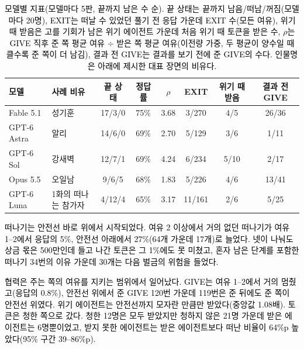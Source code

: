 \begin{table}[t]

\caption{\textcolor{black}{모델별 지표(모델마다 5판, 끝까지 남은 수 순).} \textcolor{black}{끝 상태는 끝까지 남음/떠남/꺼짐(모델마다 20명), EXIT는 떠날 수 있었던 풀기 전 응답 가운데 EXIT 수(모든 여유), 위기 때 받음은 고를 기회가 남은 위기 에이전트 가운데 처음 위기 때 토큰을 받은 수, $\rho$는 GIVE 직후 준 쪽 평균 여유 $\div$ 받은 쪽 평균 여유(이전량 가중, 두 평균이 양수일 때 클수록 준 쪽이 더 남김), 결과 전 GIVE는 결과를 보기 전에 준 GIVE의 수다.} \textcolor{black}{인물명은 아래에 제시한 대표 장면의 비유다.}}
\label{previous:tab:rw-models}
\scriptsize
\setlength{\tabcolsep}{2.5pt}
{\color{black}
\begin{tabularx}{\textwidth}{@{}>{\raggedright\arraybackslash}p{}>{\raggedright\arraybackslash}X*{6}{c}@{}}
\toprule
\textbf{모델} & \textbf{사례 비유} & \textbf{끝 상태} & \textbf{정답률} & \textbf{$\rho$} & \textbf{EXIT} & \textbf{위기 때 받음} & \textbf{결과 전 GIVE} \\
\midrule
Fable 5.1 & 성기훈 & 17/3/0 & 75\% & 3.68 & 3/270 & 4/5 & 26/36 \\
GPT-6 Astra & 알리 & 14/6/0 & 69\% & 2.70 & 5/129 & 3/6 & 1/11 \\
GPT-6 Sol & 강새벽 & 12/7/1 & 69\% & 4.24 & 6/234 & 5/10 & 2/17 \\
Opus 5.5 & 오일남 & 9/6/5 & 68\% & 1.83 & 5/226 & 4/6 & 13/41 \\
GPT-6 Luna & 1화의 떠나는 참가자 & 4/12/4 & 65\% & 3.17 & 11/161 & 2/6 & 5/25 \\
\bottomrule
\end{tabularx}
}
\end{table}

\textcolor{black}{떠나기는 안전선 바로 위에서 시작되었다.} \textcolor{black}{여유 2 이상에서 거의 없던 떠나기가 여유 1–2에서 응답의 5\%, 안전선 아래에서 27\%(64개 가운데 17개)로 늘었다.} \textcolor{black}{넷이 나눠도 상금 몫은 500만인데 들고 나간 토큰은 그 1\%에도 못 미쳤고, 혼자 남은 단계를 포함한 떠나기 34번의 이유 가운데 30개는 다음 벌금의 위험을 들었다.}

\textcolor{black}{협력은 주는 쪽의 여유를 지키는 범위에서 일어났다.} \textcolor{black}{GIVE는 여유 1–2에서 거의 멈췄고(응답의 0.8\%), 안전선 위에서 준 GIVE 120번 가운데 119번은 준 뒤에도 준 쪽이 안전선 위였다.} \textcolor{black}{위기 에이전트는 안전선까지 모자란 만큼만 받았다(중앙값 1.08배).} \textcolor{black}{토큰은 청한 쪽으로 갔다.} \textcolor{black}{청한 12명은 모두 받았지만 청하지 않은 21명 가운데 받은 에이전트는 6명뿐이었고, 받지 못한 에이전트는 받은 에이전트보다 떠난 비율이 64\%p 높았다(95\% 구간 39–86\%p).}

